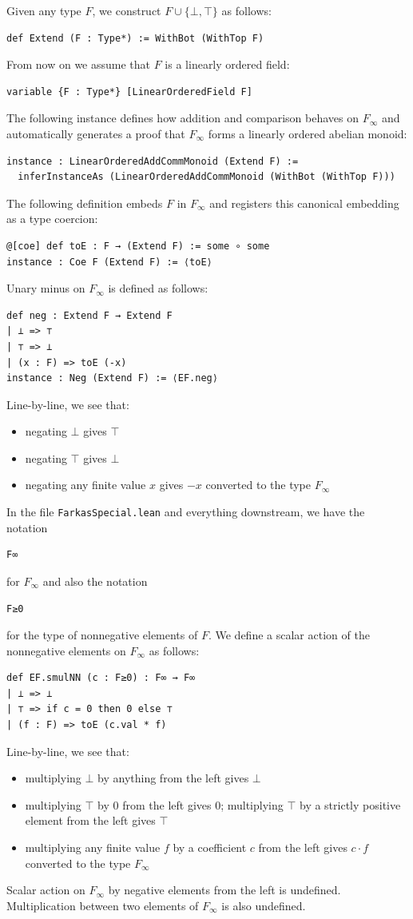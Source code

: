 \documentclass[]{article}
\renewcommand{\.}{\hskip .75pt}
\let\*=\cdot
\begin{document}
Given any type $F$, we construct $F \cup \{ \bot, \top \}$ as follows:
\begin{lstlisting}
def Extend (F : Type*) := WithBot (WithTop F)
\end{lstlisting}
From now on we assume that $F$ is a linearly ordered field:
\begin{lstlisting}
variable {F : Type*} [LinearOrderedField F]
\end{lstlisting}
The following instance defines how addition and comparison
behaves on $F_\infty$ and automatically generates a proof
that $F_\infty$ forms a linearly ordered abelian monoid:
\begin{lstlisting}
instance : LinearOrderedAddCommMonoid (Extend F) :=
  inferInstanceAs (LinearOrderedAddCommMonoid (WithBot (WithTop F)))
\end{lstlisting}
The following definition embeds $F$ in $F_\infty$ and registers
this canonical embedding as a type coercion:
\begin{lstlisting}
@[coe] def toE : F → (Extend F) := some ∘ some
instance : Coe F (Extend F) := ⟨toE⟩
\end{lstlisting}
Unary minus on $F_\infty$ is defined as follows:
\begin{lstlisting}
def neg : Extend F → Extend F
| ⊥ => ⊤
| ⊤ => ⊥
| (x : F) => toE (-x)
instance : Neg (Extend F) := ⟨EF.neg⟩
\end{lstlisting}
Line-by-line, we see that:
\begin{itemize}
\item negating $\bot$ gives $\top$
\item negating $\top$ gives $\bot$
\item negating any finite value $x$ gives $-x$ converted to the type $F_\infty$
\end{itemize}
In the file \texttt{FarkasSpecial.lean} and everything downstream,
we have the notation
\begin{lstlisting}
F∞
\end{lstlisting}
for $F_\infty$ and also the notation
\begin{lstlisting}
F≥0
\end{lstlisting}
for the type of nonnegative elements of $F$.
We define a scalar action of the nonnegative elements
on $F_\infty$ as follows:
\begin{lstlisting}
def EF.smulNN (c : F≥0) : F∞ → F∞
| ⊥ => ⊥
| ⊤ => if c = 0 then 0 else ⊤
| (f : F) => toE (c.val * f)
\end{lstlisting}
Line-by-line, we see that:
\begin{itemize}
\item multiplying $\bot$ by anything from the left gives $\bot$
\item multiplying $\top$ by $0$ from the left gives $0$;
multiplying $\top$ by a strictly positive element from the left gives $\top$
\item multiplying any finite value $f$ by a coefficient $c$ from the left
gives $c \* f$ converted to the type $F_\infty$
\end{itemize}
Scalar action on $F_\infty$ by negative elements from the left is undefined.
Multiplication between two elements of $F_\infty$ is also undefined.
\end{document}
